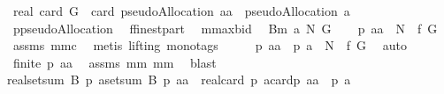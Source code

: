 \begin{isabellebody}
{\isacharequal}\ real\ {\isacharparenleft}card\ G{\isacharparenright}\ {\isacharminus}\ card\ {\isacharparenleft}pseudoAllocation\ aa\ {\isasyminter}\ {\isacharparenleft}pseudoAllocation\ a{\isacharparenright}{\isacharparenright}{\isachardoublequoteclose}\isanewline
%
\isadelimproof
%
\endisadelimproof
%
\isatagproof
{}\isamarkupfalse%
\ {\isacharminus}\isanewline
{}\isamarkupfalse%
\ {\isacharquery}p{\isacharequal}pseudoAllocation\ \isamarkupfalse%
\ {\isacharquery}f{\isacharequal}finestpart\ \isamarkupfalse%
\ {\isacharquery}m{\isacharequal}maxbid{\isacharprime}\ \isamarkupfalse%
\ {\isacharquery}B{\isacharequal}{\isachardoublequoteopen}{\isacharquery}m\ a\ N\ G{\isachardoublequoteclose}\ \isamarkupfalse%
\ \isanewline
{}{\isacharcolon}\ {\isachardoublequoteopen}{\isacharquery}p\ aa\ {\isasymsubseteq}\ N\ {\isasymtimes}\ {\isacharquery}f\ G{\isachardoublequoteclose}\ \isamarkupfalse%
\ assms\ mm{}{}c\ \isamarkupfalse%
\ {\isacharparenleft}metis\ {\isacharparenleft}lifting{\isacharcomma}\ mono{\isacharunderscore}tags{\isacharparenright}{\isacharparenright}\ \isamarkupfalse%
\ \isamarkupfalse%
\ \isanewline
{}{\isacharcolon}\ {\isachardoublequoteopen}{\isacharquery}p\ aa\ {\isasymsubseteq}\ {\isacharquery}p\ a\ {\isasymunion}\ {\isacharparenleft}N\ {\isasymtimes}\ {\isacharquery}f\ G{\isacharparenright}{\isachardoublequoteclose}\ \isamarkupfalse%
\ auto\ \isamarkupfalse%
\ \isamarkupfalse%
\ \isanewline
{}{\isacharcolon}\ {\isachardoublequoteopen}finite\ {\isacharparenleft}{\isacharquery}p\ aa{\isacharparenright}{\isachardoublequoteclose}\ \isamarkupfalse%
\ assms\ mm{}{}\ mm{}{}\ \isamarkupfalse%
\ blast\ \isamarkupfalse%
\ \isamarkupfalse%
\ \isanewline
{\isachardoublequoteopen}real{\isacharparenleft}setsum\ {\isacharquery}B\ {\isacharparenleft}{\isacharquery}p\ a{\isacharparenright}{\isacharparenright}{\isacharminus}setsum\ {\isacharquery}B\ {\isacharparenleft}{\isacharquery}p\ aa{\isacharparenright}\ {\isacharequal}\ real{\isacharparenleft}card\ {\isacharparenleft}{\isacharquery}p\ a{\isacharparenright}{\isacharparenright}{\isacharminus}card{\isacharparenleft}{\isacharquery}p\ aa\ {\isasyminter}\ {\isacharparenleft}{\isacharquery}p\ a{\isacharparenright}{\isacharparenright}{\isachardoublequoteclose}\ \isanewline

\end{isabellebody}

